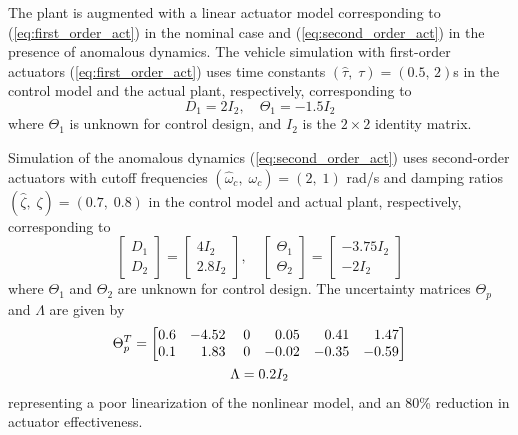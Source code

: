 \documentclass[english]{ifacconf}
\begin{document}
The plant is augmented with a linear actuator model corresponding to (\ref{eq:first_order_act}) in the nominal case and (\ref{eq:second_order_act}) in the presence of anomalous dynamics. The vehicle simulation with first-order actuators (\ref{eq:first_order_act}) uses time constants $(\hat{\tau},\;\tau) = (0.5,\,2)$s in the control model and the actual plant, respectively, corresponding to
\begin{equation}
D_1 = 2 I_2, \quad \Theta_1 = -1.5 I_2
\end{equation}
where $\Theta_1$ is unknown for control design, and $I_2$ is the $2 \times 2$ identity matrix. 

Simulation of the anomalous dynamics (\ref{eq:second_order_act}) uses second-order actuators with cutoff frequencies $(\hat{\omega}_c,\; \omega_c) = (2 ,\; 1)$ rad/s and damping ratios $(\hat{\zeta},\; \zeta) = (0.7,\; 0.8)$ in the control model and actual plant, respectively, corresponding to
\begin{equation}
\begin{bmatrix}
	D_1 \\ D_2
\end{bmatrix} = \begin{bmatrix}
	4 I_2 \\ 2.8 I_2
\end{bmatrix}, \quad \begin{bmatrix}
	\Theta_1 \\ \Theta_2 
\end{bmatrix} = \begin{bmatrix}
	-3.75 I_2 \\ -2 I_2
\end{bmatrix}
\end{equation}
where $\Theta_1$ and $\Theta_2$ are unknown for control design. The uncertainty matrices $\Theta_p$ and $\Lambda$ are given by
\begin{equation}
\begin{gathered}
\Theta_{p}^{T}=\begin{bmatrix}
0.6 & -4.52 & \; 0 & \hfill 0.05 & \hfill 0.41 & \hfill 1.47\\
0.1 & \hfill 1.83 & \; 0 & -0.02 & -0.35 & -0.59
\end{bmatrix}\\ \Lambda = 0.2 I_2 \end{gathered}
\end{equation}
representing a poor linearization of the nonlinear model, and an 80\% reduction in actuator effectiveness.
\end{document}
